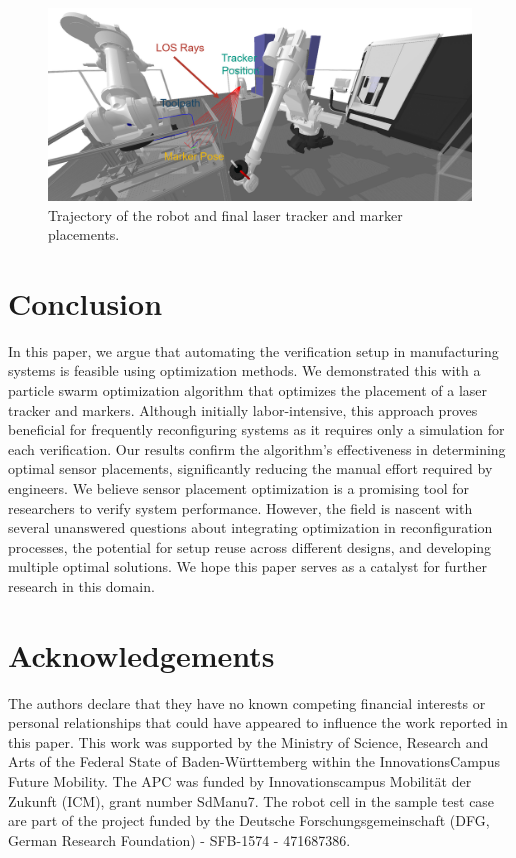 \documentclass{svproc}
\begin{document}
\begin{figure}
\centering
\includegraphics[width=\textwidth]{figures/trajectory.png}
\caption{Trajectory of the robot and final laser tracker and marker placements.}
\label{fig:trajectory}
\end{figure}

\section{Conclusion}

In this paper, we argue that automating the verification setup in manufacturing systems is feasible using optimization methods.
We demonstrated this with a particle swarm optimization algorithm that optimizes the placement of a laser tracker and markers. 
Although initially labor-intensive, this approach proves beneficial for frequently reconfiguring systems as it requires only a simulation for each verification. 
Our results confirm the algorithm's effectiveness in determining optimal sensor placements, significantly reducing the manual effort required by engineers. 
We believe sensor placement optimization is a promising tool for researchers to verify system performance. 
However, the field is nascent with several unanswered questions about integrating optimization in reconfiguration processes, 
the potential for setup reuse across different designs, and developing multiple optimal solutions. 
We hope this paper serves as a catalyst for further research in this domain.



\section{Acknowledgements}
The authors declare that they have no known competing financial interests or personal relationships that could have appeared to influence the work reported in this paper.
This work was supported by the Ministry of Science, Research and Arts of the Federal State of Baden-Württemberg within the InnovationsCampus Future Mobility. The APC was funded by Innovationscampus Mobilität der Zukunft (ICM), grant number SdManu7.
The robot cell in the sample test case are part of the project funded by the Deutsche Forschungsgemeinschaft (DFG, German Research Foundation) - SFB-1574 - 471687386.
\printbibliography
\end{document}
